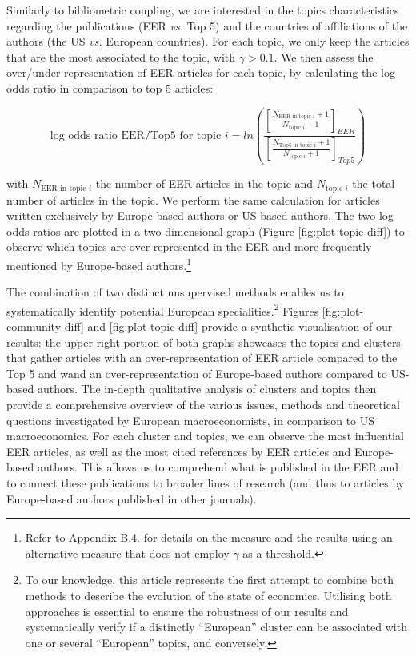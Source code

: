\documentclass[
  12pt,
  onecolumn]{article}
\begin{document}
Similarly to bibliometric coupling, we are interested in the topics
characteristics regarding the publications (EER \emph{vs.} Top 5) and
the countries of affiliations of the authors (the US \emph{vs.} European
countries). For each topic, we only keep the articles that are the most
associated to the topic, with \(\gamma > 0.1\). We then assess the
over/under representation of EER articles for each topic, by calculating
the log odds ratio in comparison to top 5 articles:

\[
\text{log odds ratio EER/Top5 for topic }i = ln(\frac{[\frac{N_{\text{EER in topic }i}+1}{N_{\text{topic }i} + 1}]_{EER}}{[\frac{N_{\text{Top5 in topic }i}+1}{N_{\text{topic }i} + 1}]_{Top5}})
\]

with \(N_{\text{EER in topic }i}\) the number of EER articles in the
topic and \(N_{\text{topic }i}\) the total number of articles in the
topic. We perform the same calculation for articles written exclusively
by Europe-based authors or US-based authors. The two log odds ratios are
plotted in a two-dimensional graph (Figure \ref{fig:plot-topic-diff}) to
observe which topics are over-represented in the EER and more frequently
mentioned by Europe-based authors.\footnote{Refer to
  \protect\hyperlink{topic}{Appendix B.4.} for details on the measure
  and the results using an alternative measure that does not employ
  \(\gamma\) as a threshold.}

The combination of two distinct unsupervised methods enables us to
systematically identify potential European specialities.\footnote{To our
  knowledge, this article represents the first attempt to combine both
  methods to describe the evolution of the state of economics. Utilising
  both approaches is essential to ensure the robustness of our results
  and systematically verify if a distinctly ``European'' cluster can be
  associated with one or several ``European'' topics, and conversely.}
Figures \ref{fig:plot-community-diff} and \ref{fig:plot-topic-diff}
provide a synthetic visualisation of our results: the upper right
portion of both graphs showcases the topics and clusters that gather
articles with an over-representation of EER article compared to the Top
5 and wand an over-representation of Europe-based authors compared to
US-based authors. The in-depth qualitative analysis of clusters and
topics then provide a comprehensive overview of the various issues,
methods and theoretical questions investigated by European
macroeconomists, in comparison to US macroeconomics. For each cluster
and topics, we can observe the most influential EER articles, as well as
the most cited references by EER articles and Europe-based authors. This
allows us to comprehend what is published in the EER and to connect
these publications to broader lines of research (and thus to articles by
Europe-based authors published in other journals).
\end{document}
